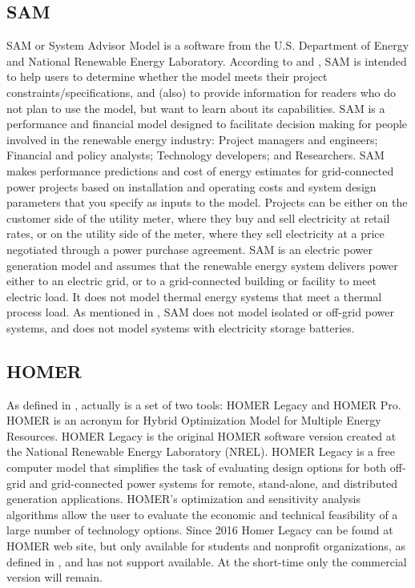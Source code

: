 \documentclass[journal]{IEEEtran}
\begin{document}
\subsection{SAM}
SAM or System Advisor Model is a software from the U.S. Department of Energy and National Renewable Energy Laboratory. According to \cite{NRELBlair} and \cite{Cameron2008}, SAM is intended to help users to determine whether the model meets their project constraints/specifications, and (also) to provide information for readers who do not plan to use the model, but want to learn about its capabilities. SAM is a performance and financial model designed to facilitate decision making for people involved in the renewable energy industry: Project managers and engineers; Financial and policy analysts; Technology developers; and Researchers. SAM makes performance predictions and cost of energy estimates for grid-connected power projects based on installation and operating costs and system design parameters that you specify as inputs to the model. Projects can be either on the customer side of the utility meter, where they buy and sell electricity at retail rates, or on the utility side of the meter, where they sell electricity at a price negotiated through a power purchase agreement. SAM is an electric power generation model and assumes that the renewable energy system delivers power either to an electric grid, or to a grid-connected building or facility to meet electric load. It does not model thermal energy systems that meet a thermal process load. As mentioned in \cite{NRELBlair}, SAM does not model isolated or off-grid power systems, and does not model systems with electricity storage batteries.

\subsection{HOMER}
As defined in \cite{HOMER}, actually is a set of two tools: HOMER Legacy and HOMER Pro. HOMER is an acronym for Hybrid Optimization Model for Multiple Energy Resources. HOMER Legacy is the original HOMER software version created at the National Renewable Energy Laboratory (NREL). HOMER Legacy is a free computer model that simplifies the task of evaluating design options for both off-grid and grid-connected power systems for remote, stand-alone, and distributed generation applications. HOMER's optimization and sensitivity analysis algorithms allow the user to evaluate the economic and technical feasibility of a large number of technology options. Since 2016 Homer Legacy can be found at HOMER web site, but only available for students and nonprofit organizations, as defined in \cite{HOMER}, and has not support available. At the short-time only the commercial version will remain.
 
\end{document}
